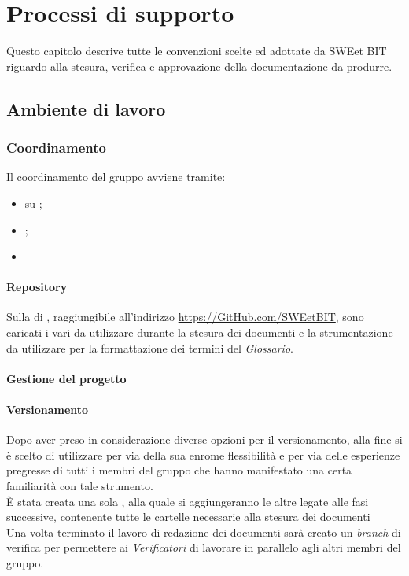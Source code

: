 \section{Processi di supporto}
Questo capitolo descrive tutte le convenzioni scelte ed adottate da SWEet BIT riguardo alla stesura, verifica e approvazione della documentazione da produrre.
\subsection{Ambiente di lavoro}
  \subsubsection{Coordinamento}
    Il coordinamento del gruppo avviene tramite:
    \begin{itemize}
      \item {} su \textbf{};
      \item {};
      \item {}
    \end{itemize}
    \paragraph{Repository}
      Sulla  di \textbf{}, raggiungibile all'indirizzo \url{https://GitHub.com/SWEetBIT}, sono caricati i vari  da utilizzare
      durante la stesura dei documenti e la strumentazione da utilizzare per la formattazione dei termini del \emph{Glossario}.
    \paragraph{Gestione del progetto}
      
    \paragraph{Versionamento}
      Dopo aver preso in considerazione diverse opzioni per il versionamento, alla fine si è scelto di utilizzare \textbf{} per via della
      sua enrome flessibilità e per via delle esperienze pregresse di tutti i membri del gruppo che hanno manifestato una certa familiarità con
      tale strumento.\\
      È stata creata una sola , alla quale si aggiungeranno le altre legate alle fasi successive, contenente tutte le cartelle necessarie
      alla stesura dei documenti \glossaryItem{\LaTeX}\.\\
      Una volta terminato il lavoro di redazione dei documenti sarà creato un \emph{branch} di verifica per permettere ai \emph{Verificatori} di
      lavorare in parallelo agli altri membri del gruppo.
